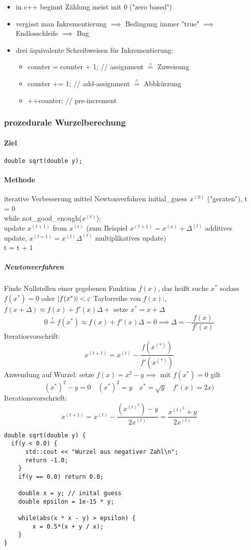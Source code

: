 \documentclass[a4paper]{scrartcl}
\newcommand{\estimates}{\overset{\scriptscriptstyle\wedge}{=}}%
\DeclarePairedDelimiter\abs{\lvert}{\rvert}%
\theoremstyle{definition}
\theoremstyle{plain}
\theoremstyle{remark}
\theoremstyle{remark}
\begin{document}
\begin{itemize}
\item in c++ beginnt Zählung meist mit $0$ ("zero based")
\item vergisst man Inkrementierung $\implies$ Bedingung immer "true" $\implies$ Endlosschleife $\implies$ Bug
\item drei äquivalente Schreibweisen für Inkrementierung:
\begin{itemize}
\item counter = counter + 1; // assignment $\estimates$ Zuweisung
\item counter += 1;          // add-assignment $\estimates$ Abbkürzung
\item ++counter;             // pre-increment
\end{itemize}
\end{itemize}
\subsubsection{prozedurale Wurzelberechung}
\label{sec-7-2-5}
\paragraph{Ziel}
\label{sec-7-2-5-1}
\begin{verbatim}
double sqrt(double y);
\end{verbatim}
\paragraph{Methode}
\label{sec-7-2-5-2}
iterative Verbesserung mittel Newtonverfahren
initial\_guess $x^{(0)}$ ("geraten"), t = 0 \\
     while not\_good\_enough($x^{(t)}$): \\
         update $x^{(t + 1)}$ from $x^{(t)}$ (zum Beispiel $x^{(t + 1)} = x^{(x)} + \Delta^{(t)}$ additives update, $x^{(t + 1)} = x^{(t)}\Delta^{(t)}$ multiplikatives update) \\
         t = t + 1 \\
\subparagraph{Newtonverfahren}
\label{sec-7-2-5-2-1}
Finde Nullstellen einer gegebenen Funktion $f(x)$, das heißt suche $x^\ast$ sodass $f(x^\ast) = 0$ oder $\abs{f(x^\ast)} < \varepsilon$
Taylorreihe von $f(x)$:, $f(x + \Delta) \approx f(x) + f'(x)\Delta +$ setze $x^\ast = x + \Delta$
\[0 \overset{!}{=} f(x^\ast) \approx f(x) + f'(x)\Delta = 0 \implies \Delta = - \frac{f(x)}{f'(x)}\]
Iteratiosvorschrift:
\[x^{(t + 1)} = x^{(t)} - \frac{f(x^{(\ast)})}{f'(x^{(\ast)})}\]
Anwendung auf Wurzel: setze $f(x) = x^2 - y \implies$ mit $f(x^\ast) = 0$ gilt
\[(x^\ast)^2 -y = 0 \quad (x^\ast)^2 = y \quad x^\ast = \sqrt{y}\quad f'(x) = 2x)\]
Iterationsvorschrieft:
\[x^{(t + 1)} = x^{(t)} - \frac{(x^{(t)^2}) - y}{2x^{(t)}} = \frac{x^{(t)^2} + y}{2x^{(t)}}\]
\begin{verbatim}
double sqrt(double y) {
  if(y < 0.0) {
	  std::cout << "Wurzel aus negativer Zahl\n";
	  return -1.0;
	}
	if(y == 0.0) return 0.0;

	double x = y; // inital guess
	double epsilon = 1e-15 * y;

	while(abs(x * x - y) > epsilon) {
		x = 0.5*(x + y / x);
	}
}
\end{verbatim}
\end{document}
